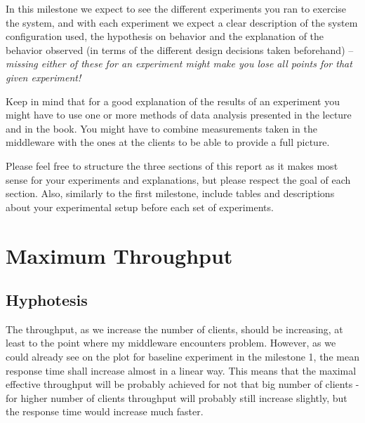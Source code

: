 \documentclass[11pt]{article}
\begin{document}
In this milestone we expect to see the different experiments you ran to exercise the system, and with each experiment we expect a clear description of the system configuration used, the hypothesis on behavior and the explanation of the behavior observed (in terms of the different design decisions taken beforehand) -- \emph{missing either of these for an experiment might make you lose all points for that given experiment!} 

Keep in mind that for a good explanation of the results of an experiment you might have to use one or more methods of data analysis presented in the lecture and in the book. You might have to combine measurements taken in the middleware with the ones at the clients to be able to provide a full picture.

Please feel free to structure the three sections of this report as it makes most sense for your experiments and explanations, but please respect the goal of each section. Also, similarly to the first milestone, include tables and descriptions about your experimental setup before each set of experiments.


\pagebreak

\section{Maximum Throughput}
\label{sec:max-throughput}


\subsection{Hyphotesis}

The throughput, as we increase the number of clients, should be increasing, at least to the point where my middleware encounters problem. However, as we could already see on the plot for baseline experiment in the milestone 1, the mean response time shall increase almost in a linear way. This means that the maximal effective throughput will be probably achieved for not that big number of clients - for higher number of clients throughput will probably still increase slightly, but the response time would increase much faster.
\end{document}
